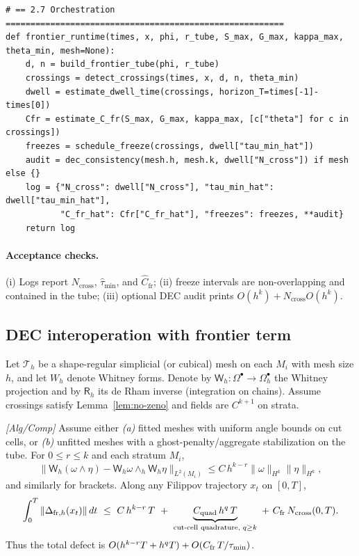 \begin{lstlisting}
# == 2.7 Orchestration ========================================================
def frontier_runtime(times, x, phi, r_tube, S_max, G_max, kappa_max, theta_min, mesh=None):
    d, n = build_frontier_tube(phi, r_tube)
    crossings = detect_crossings(times, x, d, n, theta_min)
    dwell = estimate_dwell_time(crossings, horizon_T=times[-1]-times[0])
    Cfr = estimate_C_fr(S_max, G_max, kappa_max, [c["theta"] for c in crossings])
    freezes = schedule_freeze(crossings, dwell["tau_min_hat"])
    audit = dec_consistency(mesh.h, mesh.k, dwell["N_cross"]) if mesh else {}
    log = {"N_cross": dwell["N_cross"], "tau_min_hat": dwell["tau_min_hat"],
           "C_fr_hat": Cfr["C_fr_hat"], "freezes": freezes, **audit}
    return log
\end{lstlisting}

\paragraph{Acceptance checks.}
(i) Logs report $N_{\mathrm{cross}}$, $\widehat{\tau}_{\min}$, and $\widehat{C}_{\mathrm{fr}}$;  
(ii) freeze intervals are non-overlapping and contained in the tube;  
(iii) optional DEC audit prints $O(h^k)+N_{\mathrm{cross}}O(h^k)$.



\subsection{DEC interoperation with frontier term}\label{subsec:dec}
Let $\mathcal T_h$ be a shape-regular simplicial (or cubical) mesh on each $M_i$ with mesh size $h$, and let $W_h$ denote Whitney forms. Denote by $\mathsf W_h:\Omega^\bullet\!\to\!\Omega_h^\bullet$ the Whitney projection and by $\mathsf R_h$ its de Rham inverse (integration on chains). Assume crossings satisfy Lemma~\ref{lem:no-zeno} and fields are $C^{k+1}$ on strata.

\begin{proposition}\label{prop:dec-consistency}
\emph{[\textup{Alg/Comp}]}
Assume either \emph{(a)} fitted meshes with uniform angle bounds on cut cells, or \emph{(b)} unfitted meshes with a ghost-penalty/aggregate stabilization on the tube. 
For $0\le r\le k$ and each stratum $M_i$,
\[
\| \mathsf W_h(\omega\wedge\eta)-\mathsf W_h\omega\wedge_h \mathsf W_h\eta \|_{L^2(M_i)} \le C\,h^{k-r}\|\omega\|_{H^{k}}\|\eta\|_{H^{k}},
\]
and similarly for brackets. Along any Filippov trajectory $x_t$ on $[0,T]$,
\[
\int_0^T \|\Delta_{\mathrm{fr},h}(x_t)\|\,dt \ \le\ C\,h^{k-r}\,T\ +\ \underbrace{C_{\mathrm{quad}}\,h^{\cutq}\,T}_{\text{cut-cell quadrature, } \cutq\ge k}\ +\ C_{\mathrm{fr}}\,N_{\mathrm{cross}}(0,T).
\]
Thus the total defect is $O(h^{k-r}T+h^{q}T)+O(C_{\mathrm{fr}}\,T/\tau_{\min})$.
\end{proposition}

